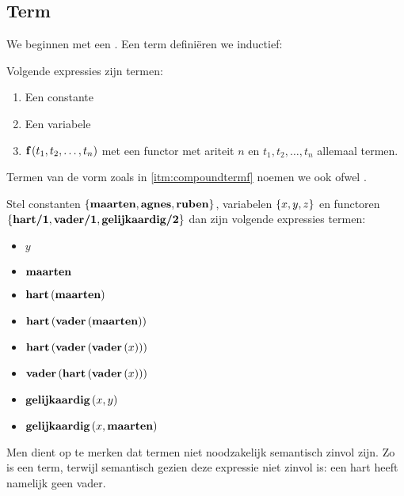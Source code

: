 \subsection{Term}
We beginnen met een . Een term defini\"eren we inductief:
\begin{definition}[Term]
Volgende expressies zijn termen:
\begin{enumerate}
 \item Een constante
 \item Een variabele
 \item \label{itm:compoundtermf} $\fun{\ldm{f}}{t_1,t_2,\ldots,t_n}$ met  een functor met ariteit $n$ en $t_1,t_2,\ldots,t_n$ allemaal termen.
\end{enumerate}
Termen van de vorm zoals in \ref{itm:compoundtermf} noemen we ook  ofwel .
\end{definition}
\begin{example}
Stel constanten $\accl{\ldm{maarten},\ldm{agnes},\ldm{ruben}}$, variabelen $\accl{x,y,z}$ en functoren $\accl{\ldm{hart/1}, \ldm{vader/1}, \ldm{gelijkaardig/2}}$ dan zijn volgende expressies termen:
\begin{multicols}{2}
\begin{itemize}
 \item $y$
 \item $\ldm{maarten}$
 \item $\func{hart}{\ldm{maarten}}$
 \item $\func{hart}{\func{vader}{\ldm{maarten}}}$
 \item $\func{hart}{\func{vader}{\func{vader}{x}}}$
 \item $\func{vader}{\func{hart}{\func{vader}{x}}}$
 \item $\func{gelijkaardig}{x,y}$
 \item $\func{gelijkaardig}{x,\ldm{maarten}}$
\end{itemize}
\end{multicols}
\end{example}
Men dient op te merken dat termen niet noodzakelijk semantisch zinvol zijn. Zo is  een term, terwijl semantisch gezien deze expressie niet zinvol is: een hart heeft namelijk geen vader.

